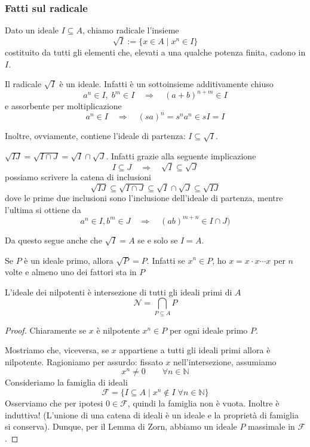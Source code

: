 \begin{multicols}{2}
\subsubsection{Fatti sul radicale}
\begin{definition} Dato un ideale $ I \subseteq A $, chiamo radicale l'insieme
	$$  \sqrt{I}:= \{ x \in A \mid x^n \in I \}  $$
	costituito da tutti gli elementi che, elevati a una qualche potenza finita, cadono in $ I $.
\end{definition}

\begin{remark}
Il radicale $ \sqrt{I} $ è un ideale. Infatti è un sottoinsieme additivamente chiuso
\[ a^n \in I,\;  b^m \in I \quad\Rightarrow\quad (a+b)^{n+m} \in I \]
e assorbente per moltiplicazione
\[ a^n \in I \quad\Rightarrow\quad (sa)^{n} = s^na^n \in sI = I \]

Inoltre, ovviamente, contiene l'ideale di partenza: $ I \subseteq \sqrt{I} $.
\end{remark}


\begin{remark}
	$ \sqrt{IJ} = \sqrt{I \cap J} = \sqrt{I} \cap \sqrt{J}  $. Infatti grazie alla seguente implicazione
	\[ I \subseteq J \quad\Rightarrow\quad \sqrt{I} \subseteq \sqrt{J} \]
	possiamo scrivere la catena di inclusioni
	\[ \sqrt{IJ} \subseteq \sqrt{I \cap J} \subseteq \sqrt{I} \cap \sqrt{J} \subseteq \sqrt{IJ} \]
	dove le prime due inclusioni sono l'inclusione dell'ideale di partenza, mentre l'ultima si ottiene da
	\[ a^n \in I, b^m \in J \quad\Rightarrow\quad (ab)^{m + n} \in I \cap J )\]
	
	Da questo segue anche che $ \sqrt{I} = A $ se e solo se $ I = A $.
\end{remark}
\begin{remark}
	Se $ P $ è un ideale primo, allora $ \boxed{\sqrt{P} = P} $. Infatti se $ x^n \in P $, ho $ x = x \cdot x \cdots x $ per $ n $ volte e almeno uno dei fattori sta in $ P $
\end{remark}

\begin{prop}
	L'ideale dei nilpotenti è intersezione di tutti gli ideali primi di $ A $
	$$  \mathcal{N} = \bigcap_{P \subseteq A} P  $$
\end{prop}
\begin{proof}
	Chiaramente se $ x $ è nilpotente $ x ^n \in P $ per ogni ideale primo $ P $.
	
	Mostriamo che, viceversa, se $ x $ appartiene a tutti gli ideali primi allora è nilpotente. Ragioniamo per assurdo: fissato $ x $ nell'intersezione, assumiamo $$  x^n \neq 0 \qquad \forall n \in \mathbb{N} $$ Consideriamo la famiglia di ideali
	$$  \mathcal{F} = \{ I \subseteq A \mid x^n \notin I \;\forall n \in \mathbb{N}  \}  $$
	Osserviamo che per ipotesi $ {0} \in \mathcal{F} $, quindi la famiglia non è vuota. Inoltre è induttiva! (L'unione di una catena di ideali è un ideale e la proprietà di famiglia si conserva). Dunque, per il Lemma di Zorn, abbiamo un ideale $ P $ massimale in $ \mathcal F $.
	

\end{proof}
\end{multicols}
